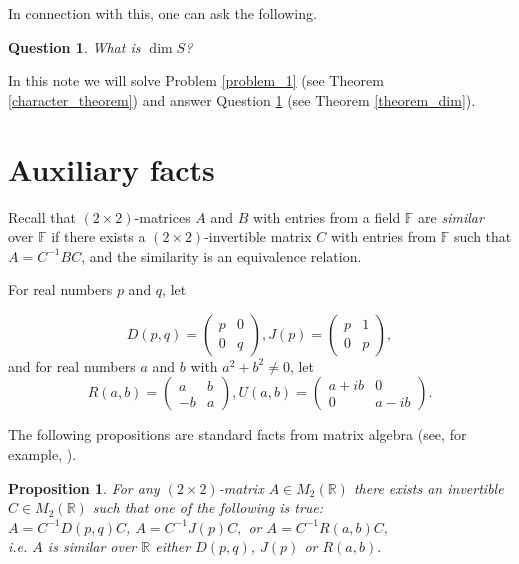 \documentclass[12pt]{amsart}
\theoremstyle{plain}
\newtheorem{prop}[thm]{Proposition}
\newtheorem{question}[thm]{Question}
\theoremstyle{definition}
\begin{document}
In connection with this, one can ask the following. 
 
\begin{question} \label{question_2} What is $\dim S$?
\end{question}

In this note we will solve Problem  \ref{problem_1} (see Theorem \ref{character_theorem}) and answer Question \ref{question_2} (see Theorem \ref{theorem_dim}).



\section{Auxiliary facts}



Recall that $(2\times 2)$-matrices $A$ and $B$ with entries from a field $\mathbb F$ are {\it similar} over $\mathbb F$ if there exists a $(2\times 2)$-invertible matrix $C$ with entries from $\mathbb F$ such that $A = C^{-1}BC$, and the similarity is an equivalence relation.

For real numbers $p$ and $q$, let 

$$D(p,q) = \left(\begin{array}{rr}  p & 0 \\ 0 & q  \end{array}\right), J(p) = \left(\begin{array}{rr}  p & 1 \\ 0 & p  \end{array}\right),$$ 
and for real numbers $a$ and $b$ with $a^2 +b^2 \ne 0$, let 
$$R(a,b) = \left(\begin{array}{rr}  a & b \\ -b & a \end{array}\right), 
U(a,b) = \left(\begin{array}{rr}  a + ib & 0 \\ 0 & a-ib  \end{array}\right).$$

The following propositions are standard facts from matrix algebra (see, for example, \cite{L}).

\begin{prop} \label{auxprop_1} For any $(2\times 2)$-matrix $A\in M_2(\mathbb R)$ there exists
 an invertible $C\in M_2(\mathbb R)$ such that one of the following is true:\\
$A=C^{-1} D(p,q)C$, $A = C^{-1} J(p) C,$ or $A = C^{-1} R(a,b) C,$\\
i.e. $A$ is similar over $\mathbb R$ either $D(p,q)$, $J(p)$ or $R(a,b).$
\end{prop}
\end{document}
